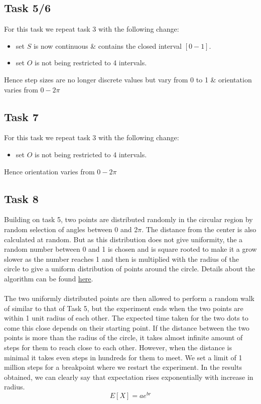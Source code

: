 \documentclass[answers]{exam}
\begin{document}
\subsection {Task 5/6}
\begin{solution}
    For this task we repeat task 3 with the following change:
    \begin{itemize}
        \item set $S$ is now continuous \& contains the closed interval $[0-1]$.
        \item set $O$ is not being restricted to 4 intervals.
    \end{itemize}
     Hence step sizes are no longer discrete values but vary from 0 to 1 \& orientation varies from $0-2\pi$
\end{solution}

\subsection {Task 7}
\begin{solution}
    For this task we repeat task 3 with the following change:
    \begin{itemize}
        \item set $O$ is not being restricted to 4 intervals.
    \end{itemize}
     Hence orientation varies from $0-2\pi$
\end{solution}

\subsection {Task 8}
\begin{solution}
    Building on task 5, two points are distributed randomly in the circular region by random selection of angles between 0 and 2$\pi$. The distance from the center is also calculated at random. But as this distribution does not give uniformity, the a random number between 0 and 1 is chosen and is square rooted to make it a grow slower as the number reaches 1 and then is multiplied with the radius of the circle to give a uniform distribution of points around the circle. Details about the algorithm can be found \href{https://blogs.sas.com/content/iml/2016/03/30/generate-uniform-2d-ball.html}{here}.\\\\
    The two uniformly distributed points are then allowed to perform a random walk of similar to that of Task 5, but the experiment ends when the two points are within 1 unit radius of each other. The expected time taken for the two dots to come this close depends on their starting point. If the distance between the two points is more than the radius of the circle, it takes almost infinite amount of steps for them to reach close to each other. However, when the distance is minimal it takes even steps in hundreds for them to meet. We set a limit of 1 million steps for a breakpoint where we restart the experiment. In the results obtained, we can clearly say that expectation rises exponentially with increase in radius.
    \[E[X] = ae^{br} \]
\end{solution}
\end{document}
